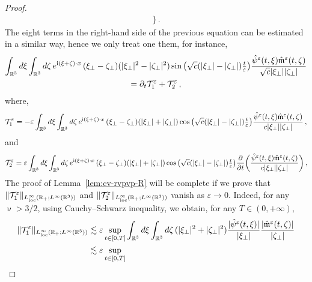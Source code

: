 \documentclass[11pt,reqno]{amsart}
\def \R{{\mathbb{R}}}
\begin{document}
\begin{proof}
\begin{align*}
    \bigg\}\,.
  \end{align*}
  The eight terms in the right-hand side of the previous equation can be estimated in a similar way, hence we only treat one them, for instance,
  \begin{multline*}
    \int_{\R^3}d\xi \int_{\R^3}d\zeta\, e^{{\rm i}(\xi+\zeta)\cdot x} \, (\xi_\perp - \zeta_\perp)(|\xi_\perp|^2 - |\zeta_\perp|^2)
    \sin\big(\sqrt{c}(|\xi_\perp|-|\zeta_\perp|) \tfrac{t}{\varepsilon}\big)
    \frac{\hat \psi^\varepsilon(t,\xi) \hat{\mathfrak  m}^\varepsilon(t,\zeta) }{\sqrt{c}|\xi_\perp||\zeta_\perp|}\\ =
    \partial_t \mathcal T_1^\varepsilon  +  \mathcal T_2^\varepsilon\,,
  \end{multline*}
  where,
  \begin{equation*}
    \mathcal T_1^\varepsilon = -\varepsilon
    \int_{\R^3}d\xi \int_{\R^3}d\zeta\, e^{{\rm i}(\xi+\zeta)\cdot x} \, (\xi_\perp - \zeta_\perp)(|\xi_\perp| + |\zeta_\perp|)
    \cos\big(\sqrt{c}(|\xi_\perp|-|\zeta_\perp|) \tfrac{t}{\varepsilon}\big)
      \frac{\hat \psi^\varepsilon(t,\xi) \hat{\mathfrak  m}^\varepsilon(t,\zeta) }{c|\xi_\perp||\zeta_\perp|}\,,
  \end{equation*}
  and  
  \begin{equation*}
    \mathcal T_2^\varepsilon = \varepsilon
    \int_{\R^3}d\xi \int_{\R^3}d\zeta\, e^{{\rm i}(\xi+\zeta)\cdot x} \, (\xi_\perp - \zeta_\perp)(|\xi_\perp| + |\zeta_\perp|)
    \cos\big(\sqrt{c}(|\xi_\perp|-|\zeta_\perp|) \tfrac{t}{\varepsilon}\big)
     \frac{\partial}{\partial t}\bigg( \frac{\hat \psi^\varepsilon(t,\xi) \hat{\mathfrak  m}^\varepsilon(t,\zeta) }{c|\xi_\perp||\zeta_\perp|}\bigg)\,,
  \end{equation*}
  The proof of Lemma~\ref{lem:cv-rvpvp-R} will be complete if we prove that $ \|\mathcal T_1^\varepsilon \|_{L_{\rm loc}^\infty(\R_+;L^\infty(\R^3))}$ and $ \|\mathcal T_2^\varepsilon \|_{L_{\rm loc}^\infty(\R_+;L^\infty(\R^3))}$ vanish as $\varepsilon \rightarrow 0$. Indeed, for any $\upnu > 3/2 $, using Cauchy--Schwarz inequality, we obtain, for any $T\in(0,+\infty)$,
   \begin{align*}
    \|\mathcal T_1^\varepsilon \|_{L_{\rm loc}^\infty(\R_+;L^\infty(\R^3))}& \lesssim \varepsilon \sup_{t\in [0,T]}
    \int_{\R^3}d\xi \int_{\R^3}d\zeta\,(|\xi_\perp|^2 + |\zeta_\perp|^2)
    \frac{|\hat \psi^\varepsilon(t,\xi)| }{|\xi_\perp|}
    \frac{|\hat{\mathfrak  m}^\varepsilon(t,\zeta)| }{|\zeta_\perp|} \nonumber\\
    & \lesssim \varepsilon \sup_{t\in [0,T]}

\end{align*}
\end{proof}
\end{document}
